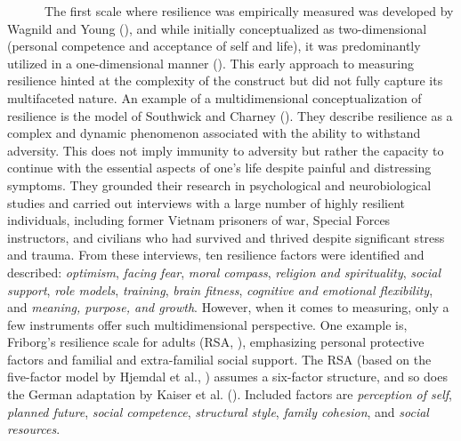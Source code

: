 \documentclass[
  man,floatsintext]{apa7}
\begin{document}
~~~~~~The first scale where resilience was empirically measured was developed by Wagnild and Young (), and while initially conceptualized as two-dimensional (personal competence and acceptance of self and life), it was predominantly utilized in a one-dimensional manner (). This early approach to measuring resilience hinted at the complexity of the construct but did not fully capture its multifaceted nature. An example of a multidimensional conceptualization of resilience is the model of Southwick and Charney (). They describe resilience as a complex and dynamic phenomenon associated with the ability to withstand adversity. This does not imply immunity to adversity but rather the capacity to continue with the essential aspects of one's life despite painful and distressing symptoms. They grounded their research in psychological and neurobiological studies and carried out interviews with a large number of highly resilient individuals, including former Vietnam prisoners of war, Special Forces instructors, and civilians who had survived and thrived despite significant stress and trauma. From these interviews, ten resilience factors were identified and described: \emph{optimism}, \emph{facing fear}, \emph{moral compass}, \emph{religion and spirituality}, \emph{social support}, \emph{role models}, \emph{training}, \emph{brain fitness}, \emph{cognitive and emotional flexibility}, and \emph{meaning, purpose, and growth}. However, when it comes to measuring, only a few instruments offer such multidimensional perspective. One example is, Friborg's resilience scale for adults (RSA, ), emphasizing personal protective factors and familial and extra-familial social support. The RSA (based on the five-factor model by Hjemdal et al., ) assumes a six-factor structure, and so does the German adaptation by Kaiser et al. (). Included factors are \emph{perception of self}, \emph{planned future}, \emph{social competence}, \emph{structural style}, \emph{family cohesion}, and \emph{social resources}.
\end{document}
